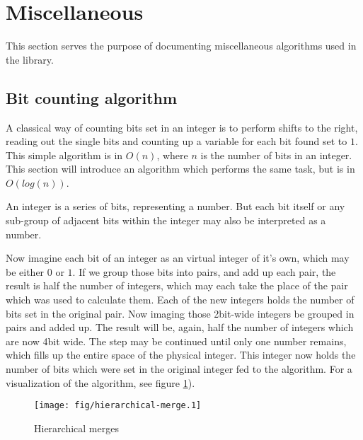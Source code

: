 \section{Miscellaneous}
\label{sec:misc}

    This section serves the purpose of documenting miscellaneous algorithms used
    in the library.


    \subsection{Bit counting algorithm}
    \label{sec:misc-bitcount}

        A classical way of counting bits set in an integer is to perform shifts
        to the right, reading out the single bits and counting up a variable for
        each bit found set to $1$.
        This simple algorithm is in $O(n)$, where $n$ is the number of bits in
        an integer.
        This section will introduce an algorithm which performs the same task,
        but is in $O(log(n))$.

        An integer is a series of bits, representing a number. But each bit
        itself or any sub-group of adjacent bits within the integer may also
        be interpreted as a number.

        Now imagine each bit of an integer as an virtual integer of it's own,
        which may be either $0$ or $1$.
        If we group those bits into pairs, and add up each pair, the result is
        half the number of integers, which may each take the place of the pair
        which was used to calculate them.
        Each of the new integers holds the number of bits set in the original
        pair.
        Now imaging those 2bit-wide integers be grouped in pairs and added up.
        The result will be, again, half the number of integers which are now
        4bit wide.
        The step may be continued until only one number remains, which fills up
        the entire space of the physical integer.
        This integer now holds the number of bits which were set in the original
        integer fed to the algorithm.
        For a visualization of the algorithm, see figure
        \ref{fig:misc-bitcount-hierarchical_merge}).

        \begin{figure}[!h]
            \caption{Hierarchical merges}
            \label{fig:misc-bitcount-hierarchical_merge}
            \begin{center}
                \texttt{[image: fig/hierarchical-merge.1]}
            \end{center}
        \end{figure}


